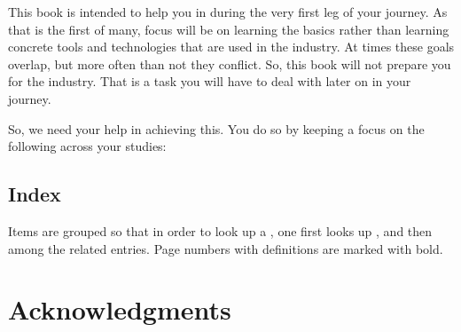 This book is intended to help you in during the very first leg of your journey. As that is the first of many, focus will be on learning the basics rather than learning concrete tools and technologies that are used in the industry. At times these goals overlap, but more often than not they conflict. So, this book will not prepare you for the industry. That is a task you will have to deal with later on in your journey.


So, we need your help in achieving this. You do so by keeping a focus on the following across your studies:
\begin{enumerate}
\end{enumerate}

\subsection{Index}

Items are grouped so that in order to look up a , one first looks up , and then  among the related entries. Page numbers with definitions are marked with bold.

\section{Acknowledgments}
